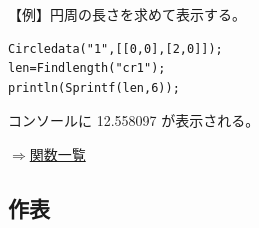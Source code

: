 \documentclass[papersize,a4paper,12pt,uplatex]{jsarticle}
\begin{document}
\begin{description}
\vspace{\baselineskip}
【例】円周の長さを求めて表示する。
\begin{verbatim}
Circledata("1",[[0,0],[2,0]]);
len=Findlength("cr1");
println(Sprintf(len,6)); 
\end{verbatim}

コンソールに 12.558097 が表示される。

\begin{flushright}\hyperlink{functionlist}{$\Rightarrow$関数一覧}\end{flushright}

\end{description}
\newpage
\subsection{作表}
\end{document}
